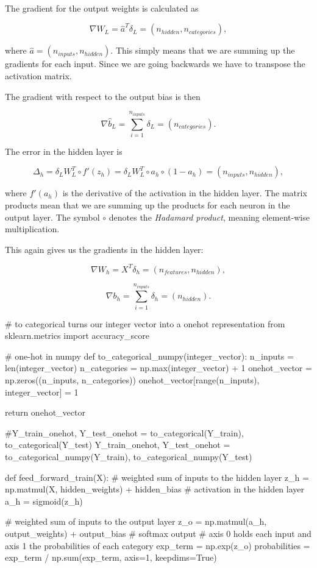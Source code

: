 \documentclass[%
oneside,                 %
final,                   %
10pt]{article}
\begin{document}
The gradient for the output weights is calculated as  

$$ \nabla W_{L} = \hat{a}^T \delta_L   = (n_{hidden}, n_{categories}) ,$$

where $\hat{a} = (n_{inputs}, n_{hidden})$. This simply means that we are summing up the gradients for each input.  
Since we are going backwards we have to transpose the activation matrix.  

The gradient with respect to the output bias is then  

$$ \nabla \hat{b}_{L} = \sum_{i=1}^{n_{inputs}} \delta_L = (n_{categories}) .$$  

The error in the hidden layer is  

$$ \Delta_h = \delta_L W_{L}^T \circ f'(z_{h}) = \delta_L W_{L}^T \circ a_{h} \circ (1 - a_{h}) = (n_{inputs}, n_{hidden}) ,$$  

where $f'(a_{h})$ is the derivative of the activation in the hidden layer. The matrix products mean
that we are summing up the products for each neuron in the output layer. The symbol $\circ$ denotes
the \emph{Hadamard product}, meaning element-wise multiplication.  

This again gives us the gradients in the hidden layer:  

$$ \nabla W_{h} = X^T \delta_h = (n_{features}, n_{hidden}) ,$$  

$$ \nabla b_{h} = \sum_{i=1}^{n_{inputs}} \delta_h = (n_{hidden}) .$$


\bpycod
# to categorical turns our integer vector into a onehot representation
from sklearn.metrics import accuracy_score

# one-hot in numpy
def to_categorical_numpy(integer_vector):
    n_inputs = len(integer_vector)
    n_categories = np.max(integer_vector) + 1
    onehot_vector = np.zeros((n_inputs, n_categories))
    onehot_vector[range(n_inputs), integer_vector] = 1
    
    return onehot_vector

#Y_train_onehot, Y_test_onehot = to_categorical(Y_train), to_categorical(Y_test)
Y_train_onehot, Y_test_onehot = to_categorical_numpy(Y_train), to_categorical_numpy(Y_test)

def feed_forward_train(X):
    # weighted sum of inputs to the hidden layer
    z_h = np.matmul(X, hidden_weights) + hidden_bias
    # activation in the hidden layer
    a_h = sigmoid(z_h)
    
    # weighted sum of inputs to the output layer
    z_o = np.matmul(a_h, output_weights) + output_bias
    # softmax output
    # axis 0 holds each input and axis 1 the probabilities of each category
    exp_term = np.exp(z_o)
    probabilities = exp_term / np.sum(exp_term, axis=1, keepdims=True)
    
\end{document}
